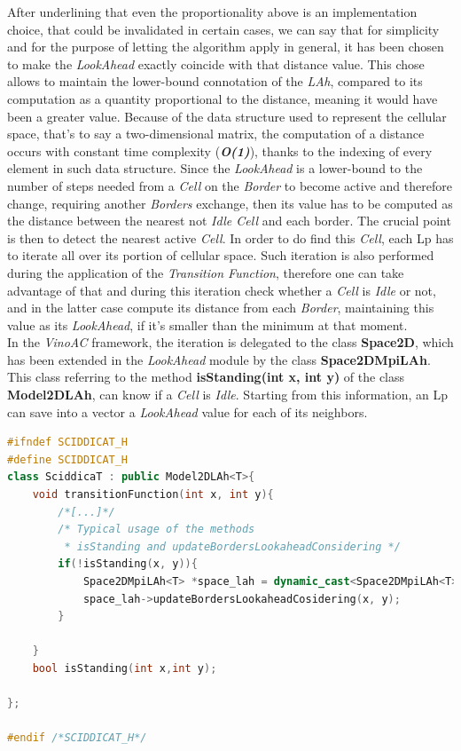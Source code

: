 \documentclass[12pt,a4paper,fleqn]{report}
\begin{document}
After underlining that even the proportionality above is an implementation choice, that could be invalidated in certain cases, we can say that for simplicity and for the purpose of letting the algorithm apply in general, it has been chosen to make the \textit{LookAhead} exactly coincide with that distance value. This chose allows to maintain the lower-bound connotation of the \textit{LAh}, compared to its computation as a quantity proportional to the distance, meaning it would have been a greater value. Because of the data structure used to represent the cellular space, that's to say a two-dimensional matrix, the computation of a distance occurs with constant time complexity (\textbf{\textit{O(1)}}), thanks to the indexing of every element in such data structure. Since the \textit{LookAhead} is a lower-bound to the number of steps needed from a \textit{Cell} on the \textit{Border} to become active and therefore change, requiring another \textit{Borders} exchange, then its value has to be computed as the distance between the nearest not \textit{Idle Cell} and each border. The crucial point is then to detect the nearest active \textit{Cell}. In order to do find this \textit{Cell}, each Lp has to iterate all over its portion of cellular space. Such iteration is also performed during the application of the \textit{Transition Function}, therefore one can take advantage of that and during this iteration check whether a \textit{Cell} is \textit{Idle } or not, and in the latter case compute its distance from each \textit{Border}, maintaining this value as  its \textit{LookAhead}, if it's smaller than the minimum at that moment. \\
In the \textit{VinoAC} framework, the iteration is delegated to the class \textbf{Space2D}, which has been extended in the \textit{LookAhead} module by the class \textbf{Space2DMpiLAh}. This class referring to the method \textbf{isStanding(int x, int y)} of the class \textbf{Model2DLAh}, can know if a \textit{Cell} is \textit{Idle}. Starting from this information, an Lp can save into a vector a \textit{LookAhead} value for each of its neighbors.
\begin{lstlisting}[language=C++,
                   directivestyle={\color{black}},
                   emph={int,char,double,float,unsigned},
                   emphstyle={\color{blue}},
                   caption={An implementation of Model2DLAh. The update of the lookahead's vector exploiting the iteration necessary to apply the \textit{Transition Function}},
                   captionpos=b,
                   label=lst:lahCompute]
#ifndef SCIDDICAT_H
#define SCIDDICAT_H
class SciddicaT : public Model2DLAh<T>{
	void transitionFunction(int x, int y){
		/*[...]*/
		/* Typical usage of the methods 
		 * isStanding and updateBordersLookaheadConsidering */
		if(!isStanding(x, y)){
			Space2DMpiLAh<T> *space_lah = dynamic_cast<Space2DMpiLAh<T> *>(space);
			space_lah->updateBordersLookaheadCosidering(x, y);
		}
				
	}
	bool isStanding(int x,int y);

};

#endif /*SCIDDICAT_H*/
\end{lstlisting}
\end{document}

